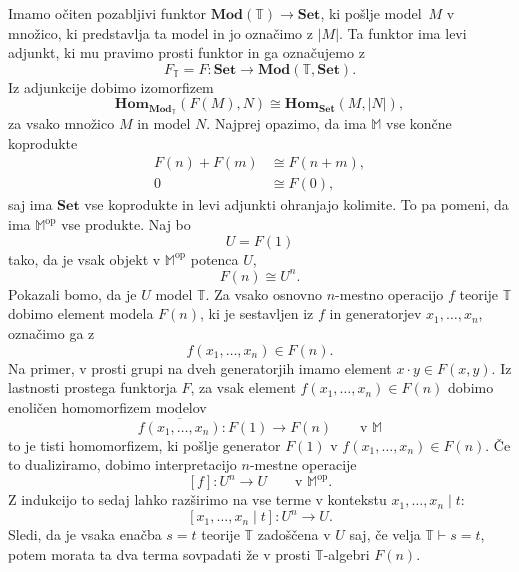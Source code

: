 \documentclass[../kategoricna_logika.tex]{subfiles}
\begin{document}
\begin{dokaz}
  Imamo očiten pozabljivi funktor
  $\mathbf{Mod}(\mathbb{T}) \to \mathbf{Set}$, ki pošlje model~$M$ v
  množico, ki predstavlja ta model in jo označimo z $|M|$.  Ta funktor
  ima levi adjunkt, ki mu pravimo prosti funktor in ga označujemo z
  \[ F_{\mathbb{T}} = F : \mathbf{Set} \to \mathbf{Mod}(\mathbb{T},
    \mathbf{Set}). \]
  Iz adjunkcije dobimo izomorfizem
  \[ \mathbf{Hom}_{\mathbf{Mod}_{\mathbb{T}}}(F(M), N) \cong
    \mathbf{Hom}_{\mathbf{Set}}(M, |N|),\] za vsako množico $M$ in
  model $N$.  Najprej opazimo, da ima $\mathbb{M}$ vse končne
  koprodukte
  \begin{align*}
    F(n) + F(m) &\cong F(n + m), \\
    0 &\cong F(0),
  \end{align*}
  saj ima $\mathbf{Set}$ vse koprodukte in levi adjunkti ohranjajo kolimite.
  To pa pomeni, da ima $\mathbb{M}^{\mathrm{op}}$ vse produkte. Naj bo
  \[ U = F(1) \]
  tako, da je vsak objekt v $\mathbb{M}^{\mathrm{op}}$ potenca $U$,
  \[ F(n) \cong U^n.\]
  Pokazali bomo, da je $U$ model $\mathbb{T}$.
  Za vsako osnovno $n$-mestno operacijo $f$ teorije $\mathbb{T}$ dobimo element modela
  $F(n)$, ki je sestavljen iz $f$ in generatorjev $x_1, \ldots, x_n$, označimo ga z
  \[ f(x_1, \ldots, x_n) \in F(n).\]
  Na primer, v prosti grupi na dveh generatorjih imamo element $x \cdot y \in F(x,y)$.
  Iz lastnosti prostega funktorja $F$, za vsak element $f(x_1, \ldots, x_n) \in F(n)$
  dobimo enoličen homomorfizem modelov
  \[ \overline{f(x_1, \ldots, x_n)} : F(1) \to F(n) \qquad \text{v $\mathbb{M}$}\]
  to je tisti homomorfizem, ki pošlje generator $F(1)$ v $f(x_1, \ldots, x_n) \in F(n)$.
  Če to dualiziramo, dobimo interpretacijo $n$-mestne operacije
  \[ [f] : U^n \to U \qquad \text{v $\mathbb{M}^{\mathrm{op}}$}.\]
  Z indukcijo to sedaj lahko razširimo na vse terme v kontekstu $x_1, \ldots, x_n \mid t$:
  \[ [x_{1}, \ldots, x_n \mid t] : U^n \to U.\]
  Sledi, da je vsaka enačba $s = t$ teorije $\mathbb{T}$ zadoščena v $U$
  saj, če velja $\mathbb{T} \vdash s = t$, potem morata ta dva terma sovpadati
  že v prosti $\mathbb{T}$-algebri $F(n)$.


\end{dokaz}
\end{document}
